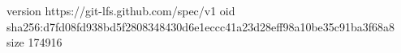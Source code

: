 version https://git-lfs.github.com/spec/v1
oid sha256:d7fd08fd938bd5f2808348430d6e1eccc41a23d28eff98a10be35c91ba3f68a8
size 174916
